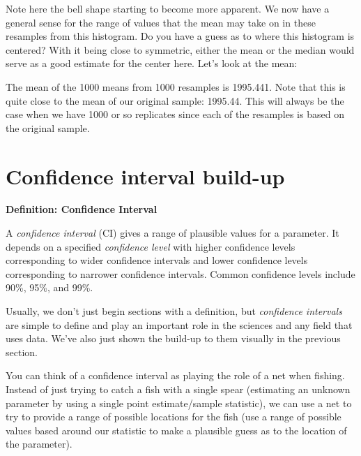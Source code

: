 \documentclass[12pt, krantz2,]{krantz}
\makeatletter
\newenvironment{Shaded}{\begin{snugshade}}{\end{snugshade}}
\newcommand{\DataTypeTok}[1]{\textcolor[rgb]{0.27,0.27,0.27}{#1}}
\newcommand{\KeywordTok}[1]{\textcolor[rgb]{0.27,0.27,0.27}{\textbf{#1}}}
\newcommand{\NormalTok}[1]{#1}
\newcommand{\OperatorTok}[1]{\textcolor[rgb]{0.43,0.43,0.43}{\textbf{#1}}}
\newcommand{\StringTok}[1]{\textcolor[rgb]{0.5,0.5,0.5}{#1}}
\newenvironment{kframe}{%
\medskip{}
\setlength{\fboxsep}{.8em}
 \def\at@end@of@kframe{}%
 \ifinner\ifhmode%
  \def\at@end@of@kframe{\end{minipage}}%
  \begin{minipage}{\columnwidth}%
 \fi\fi%
 \def\FrameCommand##1{\hskip\@totalleftmargin \hskip-\fboxsep
 \colorbox{shadecolor}{##1}\hskip-\fboxsep
     \hskip-\linewidth \hskip-\@totalleftmargin \hskip\columnwidth}%
 \MakeFramed {\advance\hsize-\width
   \@totalleftmargin\z@ \linewidth\hsize
   \@setminipage}}%
 {\par\unskip\endMakeFramed%
 \at@end@of@kframe}
\renewenvironment{Shaded}{\begin{kframe}}{\end{kframe}}
\makeatother
\begin{document}
Note here the bell shape starting to become more apparent. We now have a general sense for the range of values that the mean may take on in these resamples from this histogram. Do you have a guess as to where this histogram is centered? With it being close to symmetric, either the mean or the median would serve as a good estimate for the center here. Let's look at the mean:

\begin{Shaded}
\end{Shaded}

The mean of the 1000 means from 1000 resamples is 1995.441. Note that this is quite close to the mean of our original sample: 1995.44. This will always be the case when we have 1000 or so replicates since each of the resamples is based on the original sample.

\hypertarget{ci-build-up}{%
\section{Confidence interval build-up}\label{ci-build-up}}

\textbf{Definition: Confidence Interval}

A \emph{confidence interval} (CI) gives a range of plausible values for a parameter. It depends on a specified \emph{confidence level} with higher confidence levels corresponding to wider confidence intervals and lower confidence levels corresponding to narrower confidence intervals. Common confidence levels include 90\%, 95\%, and 99\%.

Usually, we don't just begin sections with a definition, but \emph{confidence intervals} are simple to define and play an important role in the sciences and any field that uses data. We've also just shown the build-up to them visually in the previous section.

You can think of a confidence interval as playing the role of a net when fishing. Instead of just trying to catch a fish with a single spear (estimating an unknown parameter by using a single point estimate/sample statistic), we can use a net to try to provide a range of possible locations for the fish (use a range of possible values based around our statistic to make a plausible guess as to the location of the parameter).
\end{document}
